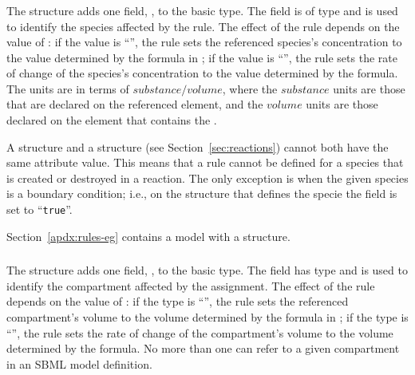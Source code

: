 \documentclass[10pt,twocolumntoc]{cekarticle}
\begin{document}
\subsubsection{}

The  structure adds one field,
, to the basic  type.  The field
 is of type  and is used to identify the species
affected by the rule.  The effect of the rule depends on the value of
: if the value is ``'', the rule sets the
referenced species's concentration to the value determined by the formula
in ; if the value is ``'', the rule sets the rate
of change of the species's concentration to the value determined by the
formula.  The units are in terms of $substance/volume$, where the
$substance$ units are those that are declared on the referenced
 element, and the $volume$ units are those declared on the
 element that contains the .

A  structure and a
 structure (see
Section~\ref{sec:reactions}) cannot both have the same 
attribute value.  This means that a rule cannot be defined for a
species that is created or destroyed in a reaction.  The only
exception is when the given species is a boundary condition; i.e.,
on the  structure that defines the specie the
 field is set to ``\texttt{true}''.

Section~\ref{apdx:rules-eg} contains a model with a
 structure.

\subsubsection{}

The  structure adds one field,
, to the basic  type.  The field
 has type  and is used to identify the
compartment affected by the assignment.  The effect of the rule depends on
the value of : if the type is ``'', the rule
sets the referenced compartment's volume to the volume determined by the
formula in ; if the type is ``'', the rule sets
the rate of change of the compartment's volume to the volume determined by
the formula.  No more than one  can refer to a
given compartment in an SBML model definition.
\end{document}
